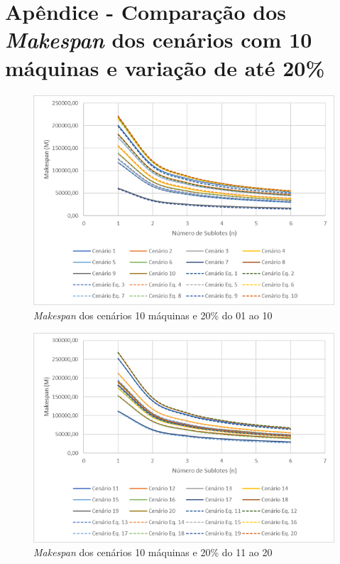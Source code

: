 \newpage
\section{Apêndice - Comparação dos \textit{Makespan} dos cenários com 10 máquinas e variação de até 20\%}\label{app:fig10machine20}

\begin{figure}[H]
    \centering
     \includegraphics[width=13cm]{Apendices/Figuras/10m20_01-10.png}
     \caption{\textit{Makespan} dos cenários 10 máquinas e 20\% do 01 ao 10}
    \label{fig:10m20_01-10}
\end{figure}

\begin{figure}[H]
    \centering
     \includegraphics[width=13cm]{Apendices/Figuras/10m20_11-20.png}
     \caption{\textit{Makespan} dos cenários 10 máquinas e 20\% do 11 ao 20}
    \label{fig:10m20_11-20}
\end{figure}

